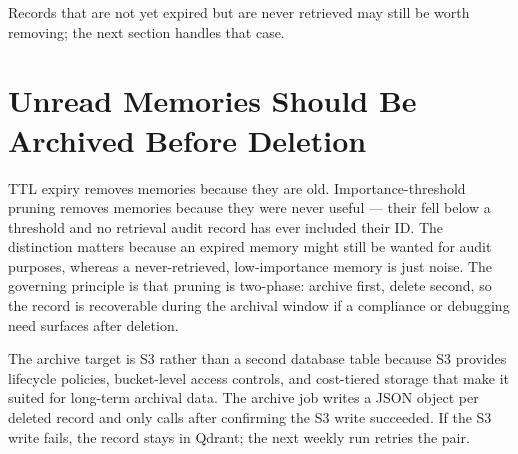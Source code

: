 Records that are not yet expired but are never retrieved may still be worth
removing; the next section handles that case.

\section{Unread Memories Should Be Archived Before Deletion}
\label{sec:pruning}

TTL expiry removes memories because they are old. Importance-threshold pruning
removes memories because they were never useful --- their 
fell below a threshold and no retrieval audit record has ever included their ID.
The distinction matters because an expired memory might still be wanted for
audit purposes, whereas a never-retrieved, low-importance memory is just noise.
The governing principle is that pruning is two-phase: archive first, delete
second, so the record is recoverable during the archival window if a compliance
or debugging need surfaces after deletion.

The archive target is S3 rather than a second database table because S3
provides lifecycle policies, bucket-level access controls, and cost-tiered
storage that make it suited for long-term archival data. The archive job writes
a JSON object per deleted record and only calls  after
confirming the S3 write succeeded. If the S3 write fails, the record stays in
Qdrant; the next weekly run retries the pair.


